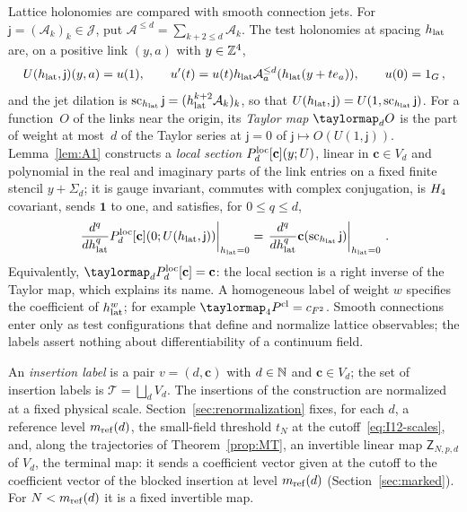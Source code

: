 Lattice holonomies are compared with smooth connection jets. For $\mathsf j=(\mathcal A_k)_k\in\mathcal J$, put $\mathcal A^{\le d}=\sum_{k+2\le d}\mathcal A_k$. The test holonomies at spacing $h_{\rm lat}$ are, on a positive link $(y,a)$ with $y\in\mathbb{Z}^4$,
\begin{equation}\label{eq:I12-test-holonomy}
U(h_{\rm lat},\mathsf j)(y,a)=u(1),\qquad
u'(t)=u(t)h_{\rm lat}\mathcal A_a^{\le d}(h_{\rm lat}(y+te_a)),\qquad u(0)=1_G\,,
\end{equation}
and the jet dilation is $\operatorname{sc}_{h_{\rm lat}}\mathsf j=(h_{\rm lat}^{k+2}\mathcal A_k)_k$, so that $U(h_{\rm lat},\mathsf j)=U(1,\operatorname{sc}_{h_{\rm lat}}\mathsf j)$. For a function~$O$ of the links near the origin, its \emph{Taylor map} $\taylormap_dO$ is the part of weight at most~$d$ of the Taylor series at $\mathsf j=0$ of $\mathsf j\mapsto O(U(1,\mathsf j))$. Lemma~\ref{lem:A1} constructs a \emph{local section} $P_{d}^{\mathrm{loc}}[\mathbf c](y;U)$, linear in $\mathbf c\in V_d$ and polynomial in the real and imaginary parts of the link entries on a fixed finite stencil $y+\Sigma_d$; it is gauge invariant, commutes with complex conjugation, is $H_4$ covariant, sends $\mathbf1$ to one, and satisfies, for $0\le q\le d$,
\begin{equation}\label{eq:I12-section-Taylor}
\left.\frac{d^q}{dh_{\rm lat}^q}P_{d}^{\mathrm{loc}}[\mathbf c](0;U(h_{\rm lat},\mathsf j))\right|_{h_{\rm lat}=0}
=\left.\frac{d^q}{dh_{\rm lat}^q}\mathbf c(\operatorname{sc}_{h_{\rm lat}}\mathsf j)\right|_{h_{\rm lat}=0}\,.
\end{equation}
Equivalently, $\taylormap_d\localsection{d}[\mathbf c]=\mathbf c$: the local section is a right inverse of the Taylor map, which explains its name. A homogeneous label of weight $w$ specifies the coefficient of $h_{\rm lat}^w$; for example $\taylormap_4P^{\rm cl}=c_{F^2}$. Smooth connections enter only as test configurations that define and normalize lattice observables; the labels assert nothing about differentiability of a continuum field.

An \emph{insertion label} is a pair $v=(d,\mathbf c)$ with $d\in\mathbb{N}$ and $\mathbf c\in V_d$; the set of insertion labels is $\mathcal T=\bigsqcup_dV_d$. The insertions of the construction are normalized at a fixed physical scale. Section~\ref{sec:renormalization} fixes, for each $d$, a reference level $m_{\mathrm{ref}}(d)$, the small-field threshold $t_N$ at the cutoff~\eqref{eq:I12-scales}, and, along the trajectories of Theorem~\ref{prop:MT}, an invertible linear map $\mathsf Z_{N,p,d}$ of $V_d$, the terminal map: it sends a coefficient vector given at the cutoff to the coefficient vector of the blocked insertion at level $m_{\mathrm{ref}}(d)$ (Section~\ref{sec:marked}). For $N<m_{\mathrm{ref}}(d)$ it is a fixed invertible map.

